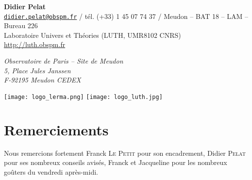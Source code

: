 \begin{center}
{\textbf{Didier Pelat} \\
\href{mailto:didier.pelat@obspm.fr}
{\tt didier.pelat@obspm.fr} / tél. (+33) 1 45 07 74 37 / Meudon – BAT 18 – LAM – Bureau 226 \\
Laboratoire Univers et Théories (LUTH, UMR8102 CNRS) \\
\url{http://luth.obspm.fr}

\textit{Observatoire de Paris – Site de Meudon\\
5, Place Jules Janssen\\
F-92195 Meudon CEDEX}
} %

\vspace{0.5cm}

\texttt{[image: logo\_lerma.png]} \hfill \texttt{[image: logo\_luth.jpg]}

\end{center}

\vfill
\hfill \makeatletter \@date \makeatother

\newpage

\thispagestyle{empty}

\section*{Remerciements}

Nous remercions fortement Franck \textsc{Le Petit} pour son encadrement, Didier
\textsc{Pelat} pour ses nombreux conseils avisés, Franck et Jacqueline pour les nombreux
goûters du vendredi après-midi.

\tableofcontents

